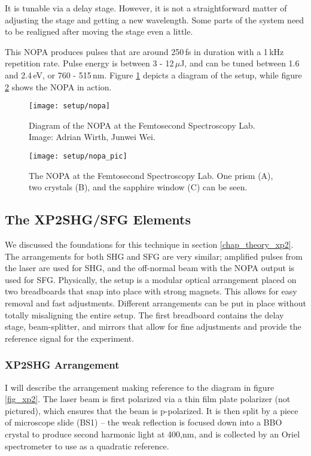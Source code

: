 It is tunable via a delay stage. However, it is not a straightforward matter of adjusting the stage and getting a new wavelength. Some parts of the system need to be realigned after moving the stage even a little.

This NOPA produces pulses that are around 250\,fs in duration with a 1\,kHz repetition rate. Pulse energy is between 3 - 12\,$\mu$J, and can be tuned between 1.6 and 2.4\,eV, or 760 - 515\,nm. Figure \ref{fig_nopa_diagram} depicts a diagram of the setup, while figure \ref{fig_nopa_work} shows the NOPA in action.

\begin{figure}[h]
\centering
\texttt{[image: setup/nopa]}
\caption[Diagram of the NOPA at the Femtosecond Spectroscopy Lab.]{Diagram of the NOPA at the Femtosecond Spectroscopy Lab. Image: Adrian Wirth, Junwei Wei.\label{fig_nopa_diagram}}
\end{figure}

\begin{figure}[h]
\centering
\texttt{[image: setup/nopa\_pic]}
\caption[The NOPA at the Femtosecond Spectroscopy Lab.]{The NOPA at the Femtosecond Spectroscopy Lab. One prism (A), two crystals (B), and the sapphire window (C) can be seen.\label{fig_nopa_work}}
\end{figure}

\subsection{The XP2SHG/SFG Elements}
We discussed the foundations for this technique in section \ref{chap_theory_xp2}. The arrangements for both SHG and SFG are very similar; amplified pulses from the laser are used for SHG, and the off-normal beam with the NOPA output is used for SFG. Physically, the setup is a modular optical arrangement placed on two breadboards that snap into place with strong magnets. This allows for easy removal and fast adjustments. Different arrangements can be put in place without totally misaligning the entire setup. The first breadboard contains the delay stage, beam-splitter, and mirrors that allow for fine adjustments and provide the reference signal for the experiment.

\subsubsection{XP2SHG Arrangement}
I will describe the arrangement making reference to the diagram in figure \ref{fig_xp2}. The laser beam is first polarized via a thin film plate polarizer (not pictured), which ensures that the beam is p-polarized. It is then split by a piece of microscope slide (BS1) -- the weak reflection is focused down into a BBO crystal to produce second harmonic light at 400,nm, and is collected by an Oriel spectrometer to use as a quadratic reference.

